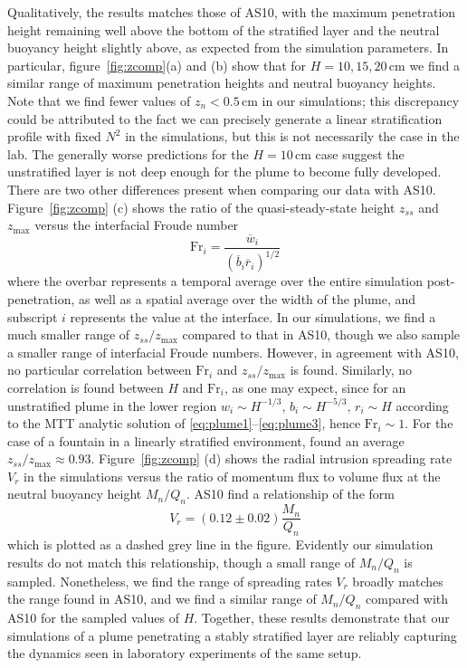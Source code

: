 \documentclass[a4paper]{article}
\begin{document}
Qualitatively, the results matches those of AS10, with the maximum penetration height remaining well above the
bottom of the stratified layer and the neutral buoyancy height slightly above, as expected from the simulation
parameters. In particular, figure~\ref{fig:zcomp}(a) and (b) show that for $H = 10, 15, 20 \,\mathrm{cm}$ we
find a similar range of maximum penetration heights and neutral buoyancy heights. Note that we find fewer
values of $z_n < 0.5 \,\mathrm{cm}$ in our simulations; this discrepancy could be attributed to the fact we
can precisely generate a linear stratification profile with fixed $N^2$ in the simulations, but this is not
necessarily the case in the lab. The generally worse predictions for the $H = 10 \, \mathrm{cm}$ case suggest
the unstratified layer is not deep enough for the plume to become fully developed. There are two other
differences present when comparing our data with AS10.  Figure~\ref{fig:zcomp} (c) shows the ratio of the
quasi-steady-state height $z_{ss}$ and $z_{\max}$ versus the interfacial Froude number
\begin{equation}
	\mathrm{Fr}_i = \frac{\overline{w}_i}{\left( \overline{b}_i \overline{r}_i\right)^{1/2}}
\end{equation}
where the overbar represents a temporal average over the entire simulation post-penetration, as well as a
spatial average over the width of the plume, and subscript $i$ represents the value at the interface. In our
simulations, we find a much smaller range of $z_{ss}/z_{\max}$ compared to that in AS10, though we also sample
a smaller range of interfacial Froude numbers. However, in agreement with AS10, no particular correlation
between $\mathrm{Fr}_i$ and $z_{ss}/z_{\max}$ is found. Similarly, no correlation is found between $H$ and
$\mathrm{Fr}_i$, as one may expect, since for an unstratified plume in the lower region $w_i \sim H^{-1/3}, \,
b_i \sim H^{-5/3}, \, r_i \sim H$ according to the MTT analytic solution of
\eqref{eq:plume1}--\eqref{eq:plume3}, hence $\mathrm{Fr}_i \sim 1$. For the case of a fountain in a linearly
stratified environment, \citet{bloomfield1998} found an average $z_{ss}/z_{\max} \approx 0.93$.
Figure~\ref{fig:zcomp} (d) shows the radial intrusion spreading rate $V_r$ in the simulations versus the ratio
of momentum flux to volume flux at the neutral buoyancy height $M_n/Q_n$. AS10 find a relationship of the form
\begin{equation}
	V_r = (0.12 \pm 0.02) \frac{M_n}{Q_n}
\end{equation}
which is plotted as a dashed grey line in the figure. Evidently our simulation results do not match this
relationship, though a small range of $M_n/Q_n$ is sampled. Nonetheless, we find the range of spreading rates
$V_r$ broadly matches the range found in AS10, and we find a similar range of $M_n/Q_n$ compared with AS10 for
the sampled values of $H$. Together, these results demonstrate that our simulations of a plume penetrating a
stably stratified layer are reliably capturing the dynamics seen in laboratory experiments of the same setup.
\end{document}

